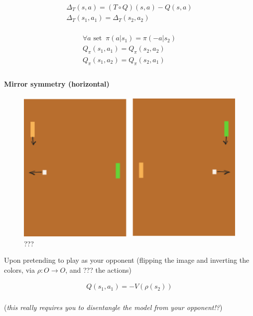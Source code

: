 \begin{align}
\Delta_{T}(s, a) = (T \circ Q)(s,a) - Q(s,a)\\
\Delta_{T}(s_1, a_1) = \Delta_{T}(s_2, a_2) \\
\end{align}

\begin{align}
\forall a \text{ set}\;\;\pi(a | s_1) = \pi(-a| s_2) \\
Q_\pi(s_1, a_1) = Q_\pi(s_2, a_2) \\
Q_\pi(s_1, a_2) = Q_\pi(s_2, a_1) \\
\end{align}

\hypertarget{mirror-symmetry-horizontal}{%
\paragraph{Mirror symmetry
(horizontal)}\label{mirror-symmetry-horizontal}}

\begin{figure}
\centering
\includegraphics[width=1\textwidth,height=0.25\textheight]{../../pictures/drawings/pong-horz-flip.png}
\caption{???}
\end{figure}

Upon pretending to play as your opponent (flipping the image and
inverting the colors, via \(\rho: O \to O\), and ??? the actions)

\begin{align}
Q(s_1, a_1) = - V(\rho(s_2)) \\
\end{align}

(\emph{this really requires you to disentangle the model from your
opponent!?})

